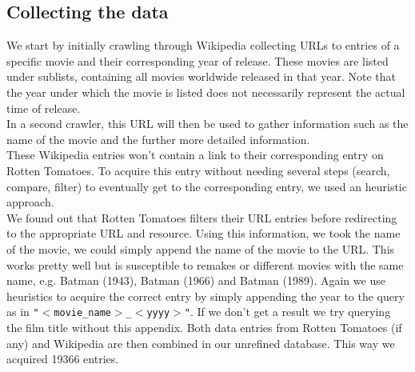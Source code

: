 \documentclass{article}
\begin{document}
\subsection{Collecting the data}
    We start by initially crawling through Wikipedia collecting URLs to entries of a specific movie and their corresponding year of release. These movies are listed under sublists, containing all movies worldwide released in that year. Note that the year under which the movie is listed does not necessarily represent the actual time of release.\\
    In a second crawler, this URL will then be used to gather information such as the name of the movie and the further more detailed information. \\
    These Wikipedia entries won't contain a link to their corresponding entry on Rotten Tomatoes. To acquire this entry without needing several steps (search, compare, filter) to eventually get to the corresponding entry, we used an heuristic approach.\\
    We found out that Rotten Tomatoes filters their URL entries before redirecting to the appropriate URL and resource. Using this information, we took the name of the movie, we could simply append the name of the movie to the URL.
    This works pretty well but is susceptible to remakes or different movies with the same name, e.g. Batman (1943), Batman (1966) and Batman (1989)\cite{batman_remakes}.
    Again we use heuristics to acquire the correct entry by simply appending the year to the query as in \texttt{"$<$movie\_name$>$\_$<$yyyy$>$"}. If we don't get a result we try querying the film title without this appendix.
    Both data entries from Rotten Tomatoes (if any) and Wikipedia are then combined in our unrefined database. This way we acquired 19366 entries. %
\end{document}
